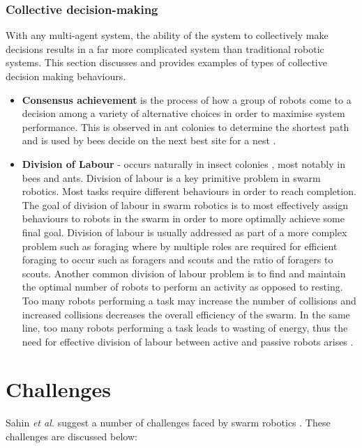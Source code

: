 \subsubsection{Collective decision-making}
With any multi-agent system, the ability of the system to collectively make decisions results in a far more complicated system than traditional robotic systems. This section discusses and provides examples of types of collective decision making behaviours. 

\begin{itemize}
	\item \textbf{Consensus achievement} is the process of how a group of robots come to a decision among a variety of alternative choices in order to maximise system performance. This is observed in ant colonies to determine the shortest path \cite{bonabeau2001self} and is used by bees decide on the next best site for a nest \cite{seeley2001nest}.
	
	\item \textbf{Division of Labour} - occurs naturally in insect colonies \cite{gautrais2002emergent}, most notably in bees and ants. Division of labour is a key primitive problem in swarm robotics. Most tasks require different behaviours in order to reach completion. The goal of division of labour in swarm robotics is to most effectively assign behaviours to robots in the swarm in order to more optimally achieve some final goal. Division of labour is usually addressed as part of a more complex problem such as foraging where by multiple roles are required for efficient foraging to occur such as foragers and scouts and the ratio of foragers to scouts. Another common division of labour problem is to find and maintain the optimal number of robots to perform an activity as opposed to resting. Too many robots performing a task may increase the number of collisions and increased collisions decreases the overall efficiency of the swarm. In the same line, too many robots performing a task leads to wasting of energy, thus the need for effective division of labour between active and passive robots arises \cite{jones2003adaptive, krieger2000call}.

\end{itemize}

\section{Challenges}
\label{challenges}

Sahin \textit{et al.} suggest a number of challenges faced by swarm robotics \cite{csahin2008special}. These challenges are discussed below: 

